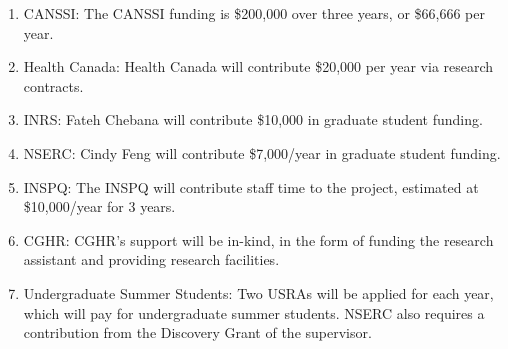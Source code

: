\documentclass[12pt,letterpaper]{article}
\begin{document}
\begin{enumerate}
    \item CANSSI: The CANSSI funding is \$200,000 over three years, or \$66,666 per year. 
    
    \item Health Canada: Health Canada will contribute \$20,000 per year via research contracts. 
    
    \item INRS: Fateh Chebana will contribute \$10,000 in graduate student funding.
    
    \item NSERC: Cindy Feng will contribute \$7,000/year in graduate student funding. 
    
    \item INSPQ: The INSPQ will contribute staff time to the project, estimated at \$10,000/year for 3 years.
    
    \item CGHR: CGHR's support will be in-kind, in the form of funding the research assistant and providing research facilities.
    
    \item Undergraduate Summer Students: Two USRAs will be applied for each year, which will pay for undergraduate summer students. NSERC also requires a contribution from the Discovery Grant of the supervisor. 
\end{enumerate}
\end{document}
